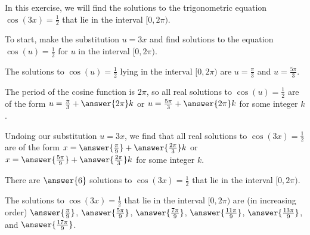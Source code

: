 \documentclass{ximera}
\author{Kenneth Berglund}
\begin{document}
\licenseSZ
In this exercise, we will find the solutions to the trigonometric equation $\cos(3x) = \frac{1}{2}$ that lie in the interval $[0, 2\pi)$.

To start, make the substitution $u = 3x$ and find solutions to the equation $\cos(u) = \frac{1}{2}$ for $u$ in the interval $[0, 2\pi)$. 

The solutions to $\cos(u) = \frac{1}{2}$ lying in the interval $[0, 2\pi)$ are $u = \frac{\pi}{3}$ and $u = \frac{5\pi}{3}$.

\begin{exercise}
The period of the cosine function is $2\pi$, so all real solutions to $\cos(u) = \frac{1}{2}$ are of the form $u = \frac{\pi}{3} + \answer{2\pi}k$ or $u = \frac{5\pi}{3} + \answer{2\pi}k$ for some integer $k$. 

\begin{exercise}
Undoing our substitution $u = 3x$, we find that all real solutions to $\cos(3x) = \frac{1}{2}$ are of the form $x = \answer{\frac{\pi}{9}} + \answer{\frac{2\pi}{3}}k$ or $x = \answer{\frac{5\pi}{9}} + \answer{\frac{2\pi}{3}}k$ for some integer $k$.

\begin{exercise}
There are $\answer{6}$ solutions to $\cos(3x) = \frac{1}{2}$ that lie in the interval $[0, 2\pi)$.

\begin{exercise}
The solutions to $\cos(3x) = \frac{1}{2}$ that lie in the interval $[0, 2\pi)$ are (in increasing order) $\answer{\frac{\pi}{9}}$, $\answer{\frac{5\pi}{9}}$, $\answer{\frac{7\pi}{9}}$, $\answer{\frac{11\pi}{9}}$, $\answer{\frac{13\pi}{9}}$, and $\answer{\frac{17\pi}{9}}$.


\end{exercise}
\end{exercise}
\end{exercise}
\end{exercise}
\end{document}
